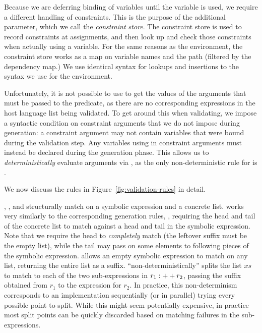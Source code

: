 Because we are deferring binding of variables until the variable is used,
we require a different handling of constraints.
This is the purpose of the additional \predtrack parameter,
which we call the \textit{constraint store}.
The constraint store is used to record constraints at assignments,
and then look up and check those constraints when actually using a variable.
For the same reasons as the environment,
the constraint store works as a map on variable names and the path
(filtered by the dependency map.)
We use identical syntax for lookups and insertions to the syntax we use for the environment.

Unfortunately, it is not possible to use \gennedby to get the values of the arguments
that must be passed to the predicate,
as there are no corresponding expressions in the host language list being validated.
To get around this when validating, we impose a syntactic condition on constraint arguments that
we do not impose during generation:
a constraint argument may not contain variables that were bound
during the validation step. Any variables using in constraint arguments must instead be declared during the generation phase.
This allows us to \textit{deterministically} evaluate
arguments via \gens,
as the only non-deterministic rule for \gens is \RuleAssign.

We now discuss the rules in Figure~\ref{fig:validation-rules} in detail.

\ValidateCons, \ValidateConcat, and \ValidateEmpty
structurally match on a symbolic expression and a concrete list.
\ValidateCons
works very similarly to the corresponding generation rules,
\RuleCons, requiring the head and tail of the concrete list to match
against a head and tail in the symbolic expression.
Note that we require the head to \textit{completely} match
(the leftover suffix must be the empty list),
while the tail may pass on some elements to following pieces of the symbolic expression.
\ValidateEmpty allows an empty symbolic expression to match on any list,
returning the entire list as a suffix.
\ValidateConcat ``non-deterministically'' splits the list $xs$
to match to each of the two sub-expressions in $r_1 :++ r_2$,
passing the suffix obtained from $r_1$ to the expression for $r_2$.
In practice, this non-determinism corresponds to an implementation sequentially (or in parallel)
trying every possible point to split.
While this might seem potentially expensive,
in practice most split points can be quickly discarded based on matching failures in the sub-expressions.

